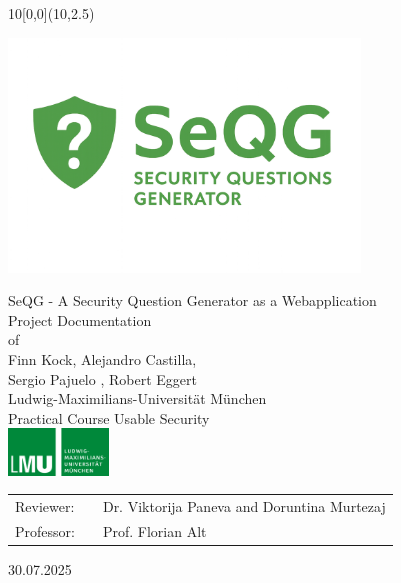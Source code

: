 \documentclass{thesisclass}
\newcommand{\type}{Project Documentation}
\newcommand{\group}{{Finn Kock}, {Alejandro Castilla}, \\
					{Sergio Pajuelo} , {Robert Eggert}}
\newcommand{\mytitle}{SeQG - A Security Question Generator as a Webapplication}
\newcommand{\course}{Practical Course Usable Security}
\newcommand{\reviewerone}{Dr. Viktorija Paneva and Doruntina Murtezaj}
\newcommand{\prof}{Prof. Florian Alt}
\newcommand{\timeend}{30.07.2025}
\begin{document}
\begin{titlepage}
	\begin{textblock}{10}[0,0](10,2.5)
	\end{textblock}

	\vspace*{0.05cm} %

	\begin{center}
		\includegraphics[width=0.7\textwidth]{images/logoandtext.png}

		\vspace*{1cm} %

		\Huge{\mytitle}
		\vspace*{0.6cm}\\ %
		\Large{
			\type\\of
		}\\
		\vspace*{1cm}
		\huge{\group}\\
		\vspace*{1cm} %
		\Large{
			{Ludwig-Maximilians-Universität München}
			\\
			\course
            \\
            \vspace*{0.7cm}
            \includegraphics[width=0.2\textwidth]{images/Logo_LMU.png}
		}
	\end{center}

	\vspace*{0.3cm} %

	\Large{
		\begin{center}
			\begin{tabular}[ht]{l c l}
				Reviewer: & \hfill  & \reviewerone\\
                Professor: & \hfill & \prof
			\end{tabular}
		\end{center}
	}
	
	\vspace{1cm} %
	\begin{center}
		\timeend
	\end{center}
\end{titlepage}

\renewcommand{\contentsname}{Index}
\tableofcontents
\clearpage




\end{document}
